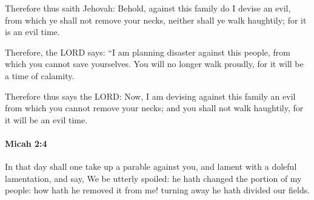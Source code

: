 			\begin{versebox}
					\item[BHS] 
					\item[LXX] 
					\item[ASV] Therefore thus saith Jehovah: Behold, against this family do I devise an evil, from which ye shall not remove your necks, neither shall ye walk haughtily; for it is an evil time.
					\item[NIV] Therefore, the LORD says: “I am planning disaster against this people, from which you cannot save yourselves. You will no longer walk proudly, for it will be a time of calamity.
					\item[NRSV] Therefore thus says the LORD: Now, I am devising against this family an evil from which you cannot remove your necks; and you shall not walk haughtily, for it will be an evil time.
			\end{versebox}

		\paragraph{Micah 2:4} %
			\label{MICAH-2-4}

			In that day shall one take up a parable against you, and lament with a doleful lamentation, and say, We be utterly spoiled: he hath changed the portion of my people: how hath he removed it from me! turning away he hath divided our fields.

